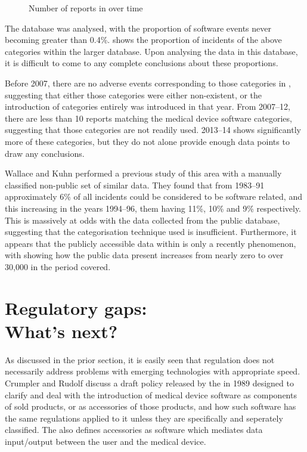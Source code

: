 \documentclass{cshonours}
\begin{document}
\begin{figure}
  \caption{Number of reports in \maude over time}
  \label{fig:totalgraph}
\end{figure}

The database was analysed, with the proportion of software events never becoming greater than 0.4\%.  shows the proportion of incidents of the above categories within the larger database. Upon analysing the data in this database, it is difficult to come to any complete conclusions about these proportions.

Before 2007, there are no adverse events corresponding to those categories in \maude, suggesting that either those categories were either non-existent, or the introduction of categories entirely was introduced in that year. From 2007--12, there are less than 10 reports matching the medical device software categories, suggesting that those categories are not readily used. 2013--14 shows significantly more of these categories, but they do not alone provide enough data points to draw any conclusions.

Wallace and Kuhn performed a previous study of this area with a manually classified non-public set of similar \fda data. They found that from 1983--91 approximately 6\% of all incidents could be considered to be software related, and this increasing in the years 1994--96, them having 11\%, 10\% and 9\% respectively. \cite{wallace2001failure} This is massively at odds with the data collected from the public \maude database, suggesting that the categorisation technique used is insufficient. Furthermore, it appears that the publicly accessible data within \maude is only a recently phenomenon, with  showing how the public data present increases from nearly zero to over 30,000 in the period covered.



\chapter{Regulatory gaps:\\What's next?}
\label{chap:reggaps}
As discussed in the prior section, it is easily seen that regulation does not necessarily address problems with emerging technologies with appropriate speed. Crumpler and Rudolf \cite{crumpler1997fda} discuss a draft policy released by the \fda in 1989 designed to clarify and deal with the introduction of medical device software as components of sold products, or as accessories of those products, and how such software has the same regulations applied to it unless they are specifically and seperately classified. The \fda also defines accessories as software which mediates data input/output between the user and the medical device.
\end{document}

